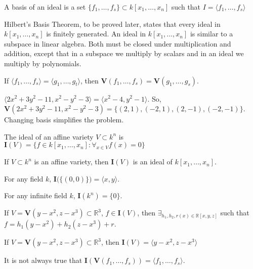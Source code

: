 \documentclass[crop=false,class=book,oneside]{standalone}
\begin{document}
\begin{definition}
A basis of an ideal is a set $\{f_1,\hdots, f_s\}\subset k[x_1,\hdots ,x_n]$ such that $I=\langle f_{1},\hdots,f_{s}\rangle$
\end{definition}
Hilbert's Basis Theorem, to be proved later, states that every ideal in $k[x_{1},\hdots,x_{n}]$ is finitely generated. An ideal in $k[x_{1},\hdots,x_{n}]$ is similar to a subspace in linear algebra. Both must be closed under multiplication and addition, except that in a subspace we multiply by scalars and in an ideal we multiply by polynomials. 
\begin{theorem}
If $\langle f_1,\hdots, f_s\rangle = \langle g_1,\hdots, g_t\rangle$, then $\mathbf{V}(f_1,\hdots, f_s) = \mathbf{V}(g_1,\hdots, g_s)$.
\end{theorem}
\begin{example}
$\langle2x^2+3y^2-11,x^2-y^2-3\rangle = \langle x^2-4,y^2-1\rangle$. So, $\mathbf{V}(2x^2+3y^2-11,x^2-y^2-3) = \{(2,1),(-2,1),(2,-1),(-2,-1)\}$. Changing basis simplifies the problem.
\end{example}
\begin{definition}
The ideal of an affine variety $V \subset k^n$ is $\mathbf{I}(V)=\{f\in k[x_1,\hdots ,x_n]:\forall_{x\in V}f(x)=0\}$
\end{definition}
\begin{theorem}
If $V\subset k^n$ is an affine variety, then $\mathbf{I}(V)$ is an ideal of $k[x_1,\hdots ,x_n]$.
\end{theorem}
\begin{theorem}
For any field $k$, $\mathbf{I}\big(\{(0,0)\}\big) = \langle x,y\rangle$.
\end{theorem}
\begin{theorem}
For any infinite field $k$, $\mathbf{I}(k^n) = \{0\}$.
\end{theorem}
\begin{theorem}
If $V = \mathbf{V}(y-x^2,z-x^3)\subset \mathbb{R}^3$, $f\in \mathbf{I}(V)$, then $\exists_{h_1,h_2,r(x)\in \mathbb{R}[x,y,z]}$ such that $f=h_1(y-x^2)+h_2(z-x^3)+r$.
\end{theorem}
\begin{theorem}
If $V = \mathbf{V}(y-x^2,z-x^3)\subset \mathbb{R}^3$, then $\mathbf{I}(V) = \langle y-x^2,z-x^3\rangle$
\end{theorem}
\begin{remark}
It is not always true that $\mathbf{I}(\mathbf{V}(f_1,\hdots, f_s)) = \langle f_1,\hdots, f_s\rangle$.
\end{remark}
\end{document}
